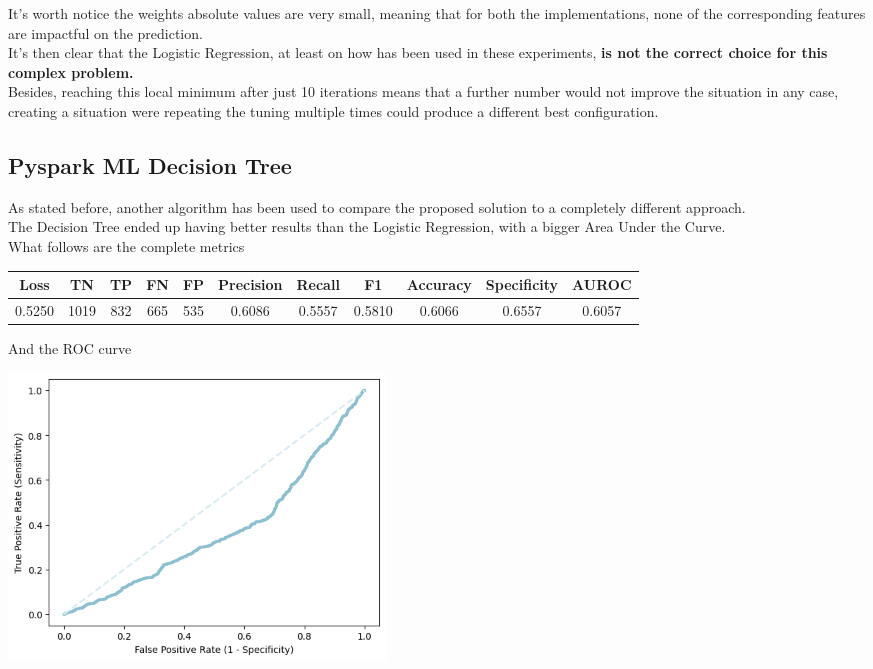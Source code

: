 \documentclass[
	letterpaper, %
	10pt, %
]{class}
\begin{document}
It's worth notice the weights absolute values are very small, meaning that for both the implementations, none of the corresponding features are impactful on the prediction.\\
It's then clear that the Logistic Regression, at least on how has been used in these experiments, \textbf{is not the correct choice for this complex problem.}\\

Besides, reaching this local minimum after just 10 iterations means that a further number would not improve the situation in any case, creating a situation were repeating the tuning multiple times could produce a different best configuration.

\subsection{Pyspark ML Decision Tree}

As stated before, another algorithm has been used to compare the proposed solution to a completely different approach.\\
The Decision Tree ended up having better results than the Logistic Regression, with a bigger Area Under the Curve.\\
What follows are the complete metrics

\begin{center}
    \begin{tabular}{ |c|c|c|c|c|c|c|c|c|c|c| }
        \hline
        Loss   & TN   & TP  & FN  & FP  & Precision & Recall & F1     & Accuracy & Specificity & AUROC  \\
        \hline
        0.5250 & 1019 & 832 & 665 & 535 & 0.6086    & 0.5557 & 0.5810 & 0.6066   & 0.6557      & 0.6057 \\
        \hline
    \end{tabular}
\end{center}

And the ROC curve

\begin{center}
    \includegraphics[width=10cm]{../images/tree_roc.png}
\end{center}
\end{document}
